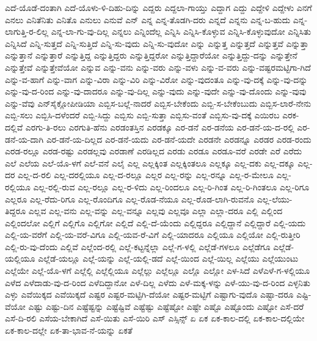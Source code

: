 ಎದೆ-ಯೊಡೆ-ದಂತಾಗಿ
ಎದೆ-ಯೊಳು-ಳಿ-ದಿಹು-ದಿನ್ನು
ಎದ್ದರು
ಎದ್ದಲಾ-ಗಾಯ್ತು
ಎದ್ದಾಗ
ಎದ್ದು
ಎದ್ದೇಳಿ
ಎದ್ದೇಳು
ಎನಗೆ
ಎನಲು
ಎನಿತೆನಿತು
ಎನಿತೊ
ಎನುಲು
ಎನುವೆ
ಎನ್
ಎನ್ನ
ಎನ್ನ-ತೊಡಗಿ-ದರು
ಎನ್ನದೆ
ಎನ್ನನು
ಎನ್ನ-ಬ-ಹುದು
ಎನ್ನ-ಲಾಗುತ್ತಿ-ರ-ಲಿಲ್ಲ
ಎನ್ನ-ಲಾ-ಗು-ವು-ದಿಲ್ಲ
ಎನ್ನಲು
ಎನ್ನಿಂದೆಲ್ಲ
ಎನ್ನಿಸಿ
ಎನ್ನಿಸಿ-ಕೊಳ್ಳುವ
ಎನ್ನಿಸಿ-ಕೊಳ್ಳುವುದೋ
ಎನ್ನಿಸಿತು
ಎನ್ನಿಸಿದೆ
ಎನ್ನಿ-ಸುತ್ತದೆ
ಎನ್ನಿ-ಸುತ್ತಿದೆ
ಎನ್ನಿ-ಸು-ವುದು
ಎನ್ನಿ-ಸು-ವುದೋ
ಎನ್ನು
ಎನ್ನುತ್ತ
ಎನ್ನುತ್ತದೆ
ಎನ್ನುತ್ತವೆ
ಎನ್ನುತ್ತಾ
ಎನ್ನುತ್ತಾನೆ
ಎನ್ನುತ್ತಾರೆ
ಎನ್ನುತ್ತಿದ್ದ
ಎನ್ನುತ್ತಿದ್ದರು
ಎನ್ನುತ್ತಿದ್ದರೋ
ಎನ್ನುತ್ತಿದ್ದಾರೆಯೋ
ಎನ್ನುತ್ತಿದ್ದು-ದನ್ನು
ಎನ್ನುತ್ತೇನೆ
ಎನ್ನುತ್ತೇವೆ
ಎನ್ನುತ್ತೇವೆಯೋ
ಎನ್ನುವ
ಎನ್ನು-ವನು
ಎನ್ನು-ವರು
ಎನ್ನು-ವಳು
ಎನ್ನು-ವ-ವರು
ಎನ್ನು-ವಷ್ಟರಮಟ್ಟಿಗಾ-ಗಿದೆ
ಎನ್ನು-ವ-ಹಾಗೆ
ಎನ್ನು-ವಾಗ
ಎನ್ನು-ವಿರಾ
ಎನ್ನು-ವಿರಿ
ಎನ್ನು-ವಿರೋ
ಎನ್ನು-ವುದಂತೂ
ಎನ್ನು-ವು-ದಕ್ಕೆ
ಎನ್ನು-ವು-ದನ್ನು
ಎನ್ನು-ವು-ದ-ರಿಂದ
ಎನ್ನು-ವು-ದಾದರೂ
ಎನ್ನು-ವು-ದಿಲ್ಲ
ಎನ್ನು-ವುದು
ಎನ್ನು-ವುದೇ
ಎನ್ನು-ವು-ದೊಂದು
ಎನ್ನು-ವುವು
ಎನ್ನು-ವೆವು
ಎನ್‌ಸೈಕ್ಲೋಪೀಡಿಯಾ
ಎಬ್ಬಿಸ-ಬಲ್ಲೆ-ನಾದರೆ
ಎಬ್ಬಿಸ-ಬೇಕೆಂದು
ಎಬ್ಬಿ-ಸ-ಬೇಕೆಂಬುದು
ಎಬ್ಬಿಸ-ಲಾರೆ-ನೇನು
ಎಬ್ಬಿ-ಸಲು
ಎಬ್ಬಿಸಿ-ದಳೆಂದರೆ
ಎಬ್ಬಿ-ಸಿದ್ದು
ಎಬ್ಬಿಸು
ಎಬ್ಬಿ-ಸುತ್ತಾ
ಎಬ್ಬಿಸು-ವಂತೆ
ಎಬ್ಬಿಸು-ವು-ದಕ್ಕೆ
ಎಯಿರಬ
ಎರಕ-ದಲ್ಲಿವೆ
ಎರಗು-ತಿ-ರಲು
ಎರಗುತಿ-ಹೆನು
ಎರಡಂತಸ್ತಿನ
ಎರಡಕ್ಕೂ
ಎರ-ಡನೆ
ಎರ-ಡನೆಯ
ಎರ-ಡನೆ-ಯ-ದ-ರಲ್ಲಿ
ಎರ-ಡನೆ-ಯ-ದಾಗಿ
ಎರ-ಡನೆ-ಯ-ದಿಲ್ಲದ
ಎರ-ಡನೆ-ಯದು
ಎರ-ಡನೆ-ಯದೇ
ಎರಡನೇ
ಎರಡನ್ನೂ
ಎರಡರ
ಎರಡ-ರಂದು
ಎರಡ-ರಲ್ಲೂ
ಎರಡ-ರಷ್ಟು
ಎರಡಲ್ಲವು
ಎರಡಾಣೆ
ಎರಡಿಲ್ಲದ
ಎರಡು
ಎರಡೂ
ಎರಡೂ-ವರೆ
ಎರಡೇ
ಎರೆ
ಎರೆದು
ಎಲೆ
ಎಲೆಯ
ಎಲೆ-ಯೊ-ಳಗೆ
ಎಲೆ-ವನೆ
ಎಲೈ
ಎಲ್ಲ
ಎಲ್ಲಕ್ಕಿಂತ
ಎಲ್ಲಕ್ಕಿಂತಲೂ
ಎಲ್ಲಕ್ಕೂ
ಎಲ್ಲ-ದಕು
ಎಲ್ಲ-ದಕ್ಕೂ
ಎಲ್ಲ-ದರ
ಎಲ್ಲ-ದ-ರಲಿ
ಎಲ್ಲ-ದರಲ್ಲಿಯೂ
ಎಲ್ಲ-ದ-ರಲ್ಲೂ
ಎಲ್ಲರ
ಎಲ್ಲ-ರನ್ನು
ಎಲ್ಲ-ರನ್ನೂ
ಎಲ್ಲ-ರ-ಮೇಲೂ
ಎಲ್ಲ-ರಲ್ಲಿಯೂ
ಎಲ್ಲ-ರಲ್ಲಿ-ರುವ
ಎಲ್ಲ-ರಲ್ಲೂ
ಎಲ್ಲ-ರ-ಳಿದು
ಎಲ್ಲ-ರಿಂದಲೂ
ಎಲ್ಲ-ರಿ-ಗಿಂತ
ಎಲ್ಲ-ರಿ-ಗಿಂತಲೂ
ಎಲ್ಲ-ರಿಗೂ
ಎಲ್ಲರೂ
ಎಲ್ಲ-ರೆದು-ರಿಗೂ
ಎಲ್ಲ-ರೊಂದಿಗೂ
ಎಲ್ಲ-ರೊಡ-ನೆಯೂ
ಎಲ್ಲ-ರೊಡ-ಲಾಗಿ-ರುವನೊ
ಎಲ್ಲ-ಲೆಯು-ತಿದ್ದರೂ
ಎಲ್ಲವ
ಎಲ್ಲ-ವನು
ಎಲ್ಲ-ವನ್ನು
ಎಲ್ಲ-ವನ್ನೂ
ಎಲ್ಲವು
ಎಲ್ಲವೂ
ಎಲ್ಲಾ
ಎಲ್ಲಾ-ದರೂ
ಎಲ್ಲಿ
ಎಲ್ಲಿಂದ
ಎಲ್ಲಿಂದಲೋ
ಎಲ್ಲಿಗೆ
ಎಲ್ಲಿಗೊ
ಎಲ್ಲಿಗೋ
ಎಲ್ಲಿದೆ
ಎಲ್ಲಿ-ದೆ-ಯೆಂದು
ಎಲ್ಲಿದ್ದರೂ
ಎಲ್ಲಿದ್ದಾನೆ
ಎಲ್ಲಿದ್ದಾರೆ
ಎಲ್ಲಿ-ಯದು
ಎಲ್ಲಿ-ಯ-ವರೆಗೆ
ಎಲ್ಲಿ-ಯ-ವರೆ-ವಿಗೂ
ಎಲ್ಲಿ-ಯವ-ರೆ-ವಿಗೆ
ಎಲ್ಲಿ-ಯಾದರೂ
ಎಲ್ಲಿಯೂ
ಎಲ್ಲಿಯೋ
ಎಲ್ಲಿ-ರುತ್ತೀರಿ
ಎಲ್ಲಿ-ರು-ವು-ದೆಂದು
ಎಲ್ಲಿವೆ
ಎಲ್ಲೆಂದ-ರಲ್ಲಿ
ಎಲ್ಲೆ-ಕಟ್ಟನ್ನೆಲ್ಲಾ
ಎಲ್ಲೆ-ಗ-ಳಲ್ಲಿ
ಎಲ್ಲೆಡೆ-ಗಳಲೂ
ಎಲ್ಲೆಡೆಗೂ
ಎಲ್ಲೆಡೆ-ಯಲ್ಲಿಯೂ
ಎಲ್ಲೆಡೆ-ಯಲ್ಲೂ
ಎಲ್ಲೆ-ಯನ್ನು
ಎಲ್ಲೆ-ಯಲ್ಲಿ-ಡದೆ
ಎಲ್ಲೆ-ಯಿಂದ
ಎಲ್ಲೆ-ಯಿಲ್ಲ
ಎಲ್ಲೆಯು
ಎಲ್ಲೆಯುಂಟು
ಎಲ್ಲೆಯೇ
ಎಲ್ಲೆ-ಯೊ-ಳಗೆ
ಎಲ್ಲೆಲ್ಲಿ
ಎಲ್ಲೆಲ್ಲಿಯೂ
ಎಲ್ಲೆಲ್ಲು
ಎಲ್ಲೆಲ್ಲೂ
ಎಲ್ಲೊ
ಎಲ್ಲೋ
ಎಳ-ಸಿದೆ
ಎಳೆಎಳೆ-ಗ-ಳಲ್ಲಿಯೂ
ಎಳೆದ
ಎಳೆದಾಡು-ವು-ದ-ರಿಂದ
ಎಳೆದಿದ್ದಾನೋ
ಎಳೆ-ದಿಲ್ಲ
ಎಳೆದು
ಎಳೆ-ಮಕ್ಕ-ಳನ್ನು
ಎಳೆ-ಯು-ವು-ದ-ರಿಂದ
ಎಳ್ಳನಿತು
ಎಳ್ಳು
ಎವೆಯಿಕ್ಕದ
ಎವೆಯಿಕ್ಕದೆ
ಎಷ್ಟರ
ಎಷ್ಟರ-ಮಟ್ಟಿಗಿ-ದೆಯೋ
ಎಷ್ಟರ-ಮಟ್ಟಿಗೆ
ಎಷ್ಟಾಗು-ವುದೊ
ಎಷ್ಟಾ-ದರೂ
ಎಷ್ಟಿ-ವೆಯೋ
ಎಷ್ಟು
ಎಷ್ಟು-ದಿನ
ಎಷ್ಟೆಷ್ಟನ್ನು
ಎಷ್ಟೆಷ್ಟಿವೆ
ಎಷ್ಟೆಷ್ಟು
ಎಷ್ಟೆಷ್ಟೋ
ಎಷ್ಟೇ
ಎಷ್ಟೊ
ಎಷ್ಟೊಂದು
ಎಷ್ಟೋ
ಎಸೆ-ದರೆ
ಎಸೆ-ದಿ-ರಲಿ
ಎಸೆಯ-ಬೇಕಾಗಿದೆ
ಎಸೆ-ಯಿತು
ಎಸೆ-ಯಿರಿ
ಎಸ್
ಎಸ್ಸಿನ್ಸ್
ಏ
ಏಕ
ಏಕ-ಕಾಲ-ದಲ್ಲಿ
ಏಕ-ಕಾಲ-ದಲ್ಲಿಯೇ
ಏಕ-ಕಾಲ-ದಲ್ಲೇ
ಏಕ-ತಾ-ಭಾವ-ನೆ-ಯನ್ನು
ಏಕತೆ
